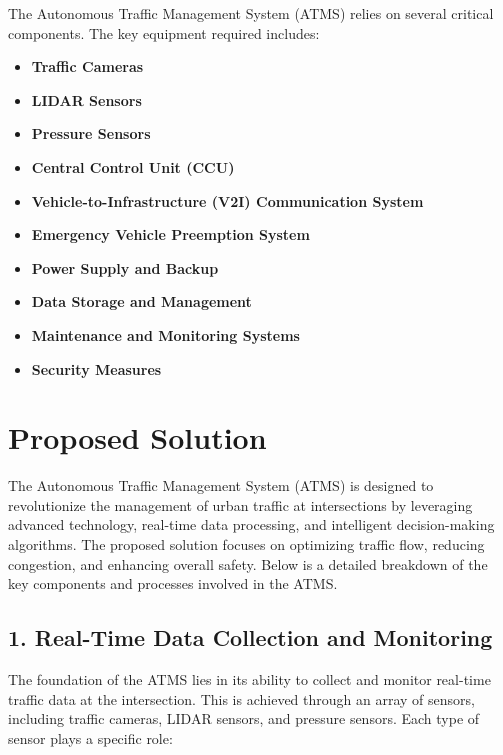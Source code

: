 \documentclass{scrreprt}
\begin{document}
The Autonomous Traffic Management System (ATMS) relies on several critical components. The key equipment required includes:

\begin{itemize}
    \item \textbf{Traffic Cameras}
    \item \textbf{LIDAR Sensors}
    \item \textbf{Pressure Sensors}
    \item \textbf{Central Control Unit (CCU)}
    \item \textbf{Vehicle-to-Infrastructure (V2I) Communication System}
    \item \textbf{Emergency Vehicle Preemption System}
    \item \textbf{Power Supply and Backup}
    \item \textbf{Data Storage and Management}
    \item \textbf{Maintenance and Monitoring Systems}
    \item \textbf{Security Measures}
\end{itemize}

\section*{Proposed Solution}

The Autonomous Traffic Management System (ATMS) is designed to revolutionize the management of urban traffic at intersections by leveraging advanced technology, real-time data processing, and intelligent decision-making algorithms. The proposed solution focuses on optimizing traffic flow, reducing congestion, and enhancing overall safety. Below is a detailed breakdown of the key components and processes involved in the ATMS.

\subsection*{1. Real-Time Data Collection and Monitoring}

The foundation of the ATMS lies in its ability to collect and monitor real-time traffic data at the intersection. This is achieved through an array of sensors, including traffic cameras, LIDAR sensors, and pressure sensors. Each type of sensor plays a specific role:
\end{document}
